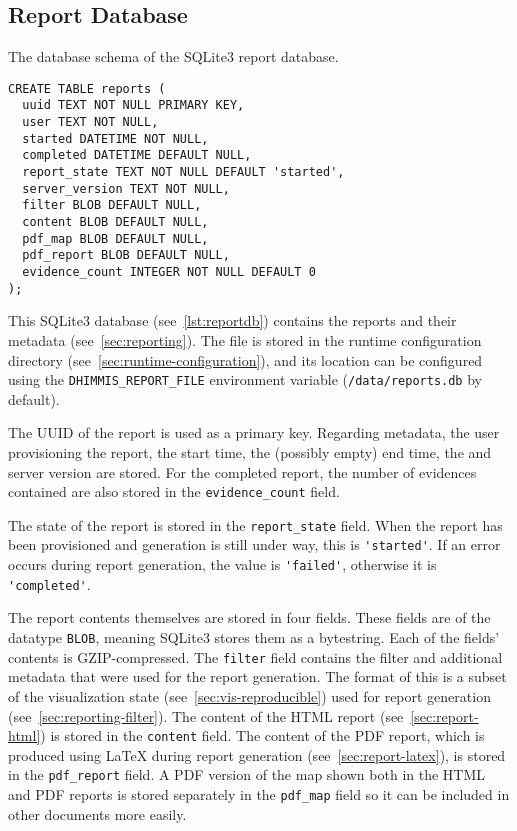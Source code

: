 \subsection{Report Database}
\label{sec:report-database}

\begin{lstfloat}
  \centering
  \caption{The database schema of the SQLite3 report database.}
  \label{lst:reportdb}

  \begin{lstlisting}
CREATE TABLE reports (
  uuid TEXT NOT NULL PRIMARY KEY,
  user TEXT NOT NULL,
  started DATETIME NOT NULL,
  completed DATETIME DEFAULT NULL,
  report_state TEXT NOT NULL DEFAULT 'started',
  server_version TEXT NOT NULL,
  filter BLOB DEFAULT NULL,
  content BLOB DEFAULT NULL,
  pdf_map BLOB DEFAULT NULL,
  pdf_report BLOB DEFAULT NULL,
  evidence_count INTEGER NOT NULL DEFAULT 0
);
  \end{lstlisting}
\end{lstfloat}

This SQLite3 database (see~\cref{lst:reportdb}) contains the reports and their metadata (see~\cref{sec:reporting}).
The file is stored in the runtime configuration directory (see~\cref{sec:runtime-configuration}), and its location can be configured using the \verb!DHIMMIS_REPORT_FILE! environment variable (\verb!/data/reports.db! by default).

The UUID of the report is used as a primary key.
Regarding metadata, the user provisioning the report, the start time, the (possibly empty) end time, the and server version are stored.
For the completed report, the number of evidences contained are also stored in the \verb!evidence_count! field.

The state of the report is stored in the \verb!report_state! field.
When the report has been provisioned and generation is still under way, this is \verb!'started'!.
If an error occurs during report generation, the value is \verb!'failed'!, otherwise it is \verb!'completed'!.

The report contents themselves are stored in four fields.
These fields are of the datatype \verb!BLOB!, meaning SQLite3 stores them as a bytestring.
Each of the fields' contents is GZIP-compressed.
The \verb!filter! field contains the filter and additional metadata that were used for the report generation.
The format of this is a subset of the visualization state (see~\cref{sec:vis-reproducible}) used for report generation (see~\cref{sec:reporting-filter}).
The content of the HTML report (see~\cref{sec:report-html}) is stored in the \verb!content! field.
The content of the PDF report, which is produced using \LaTeX{} during report generation (see~\cref{sec:report-latex}), is stored in the \verb!pdf_report! field.
A PDF version of the map shown both in the HTML and PDF reports is stored separately in the \verb!pdf_map! field so it can be included in other documents more easily.


